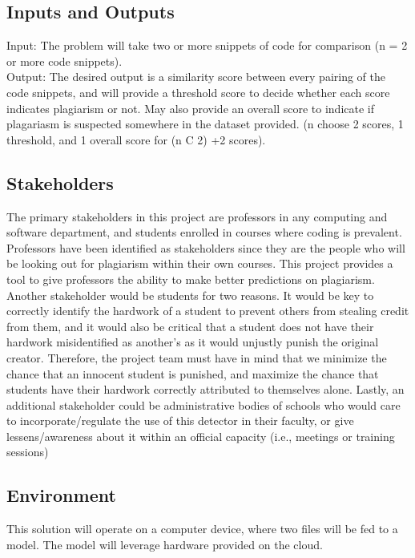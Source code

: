 \documentclass{article}
\begin{document}
\subsection{Inputs and Outputs}
Input: The problem will take two or more snippets of code for comparison (n = 2 
or more code snippets). \\
Output: The desired output is a similarity score between every pairing of the
code snippets, and will provide a threshold score to decide whether each score
indicates plagiarism or not. May also provide an overall score to indicate if
plagariasm is suspected somewhere in the dataset provided. (n choose 2 scores, 1
threshold, and 1 overall score for (n C 2) +2 scores). 


\subsection{Stakeholders}
The primary stakeholders in this project are professors in any computing and
software department, and students enrolled in courses where coding is prevalent.
Professors have been identified as stakeholders since they are the people who
will be looking out for plagiarism within their own courses. This project
provides a tool to give professors the ability to make better predictions on
plagiarism. Another stakeholder would be students for two reasons. It would be
key to correctly identify the hardwork of a student to prevent others from
stealing credit from them, and it would also be critical that a student does not
have their hardwork misidentified as another's as it would unjustly punish the
original creator. Therefore, the project team must have in mind that we minimize
the chance that an innocent student is punished, and maximize the chance that
students have their hardwork correctly attributed to themselves alone. Lastly,
an additional stakeholder could be administrative bodies of schools who would
care to incorporate/regulate the use of this detector in their faculty, or give
lessens/awareness about it within an official capacity (i.e., meetings or
training sessions)

\subsection{Environment}
This solution will operate on a computer device, where two files will be fed to 
a model.
The model will leverage hardware provided on the cloud.
\end{document}
